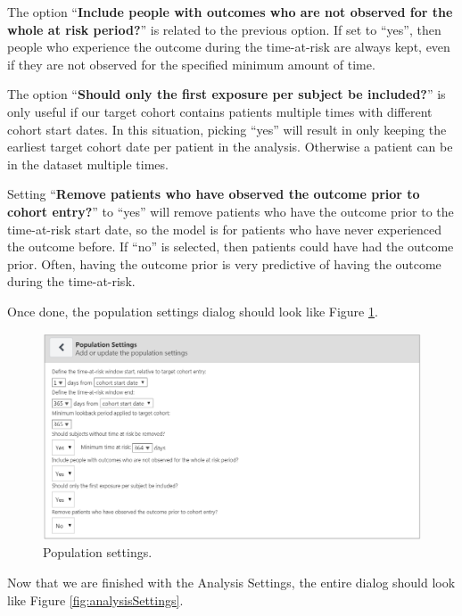 \documentclass[
  11pt]{book}
\theoremstyle{definition}
\theoremstyle{definition}
\theoremstyle{definition}
\theoremstyle{definition}
\theoremstyle{remark}
\begin{document}
The option ``\textbf{Include people with outcomes who are not observed for the whole at risk period?}'' is related to the previous option. If set to ``yes'', then people who experience the outcome during the time-at-risk are always kept, even if they are not observed for the specified minimum amount of time.

The option ``\textbf{Should only the first exposure per subject be included?}'' is only useful if our target cohort contains patients multiple times with different cohort start dates. In this situation, picking ``yes'' will result in only keeping the earliest target cohort date per patient in the analysis. Otherwise a patient can be in the dataset multiple times.

Setting ``\textbf{Remove patients who have observed the outcome prior to cohort entry?}'' to ``yes'' will remove patients who have the outcome prior to the time-at-risk start date, so the model is for patients who have never experienced the outcome before. If ``no'' is selected, then patients could have had the outcome prior. Often, having the outcome prior is very predictive of having the outcome during the time-at-risk.

Once done, the population settings dialog should look like Figure \ref{fig:populationSettings}.

\begin{figure}

{\centering \includegraphics[width=1\linewidth]{images/PatientLevelPrediction/populationSettings} 

}

\caption{Population settings.}\label{fig:populationSettings}
\end{figure}

Now that we are finished with the Analysis Settings, the entire dialog should look like Figure \ref{fig:analysisSettings}.
\end{document}
